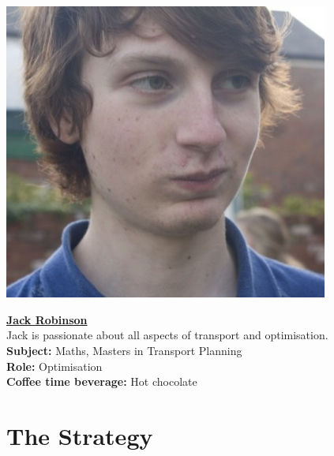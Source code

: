\documentclass[a4paper,11pt]{article}  %
\begin{document}
\noindent \begin{minipage}{0.4\textwidth}
  \includegraphics[width=0.8\textwidth]{JackProfile.jpg}
\end{minipage}
\hfill
\begin{minipage}{0.6\textwidth}
  {\large \textbf{\underline{Jack Robinson}}}\\

  Jack is passionate about all aspects of transport and optimisation. \\

  \textbf{Subject:} Maths, Masters in Transport Planning\\
  \textbf{Role:} Optimisation\\
  \textbf{Coffee time beverage:} Hot chocolate
\end{minipage}

\bigskip

\section*{The Strategy}
\end{document}
